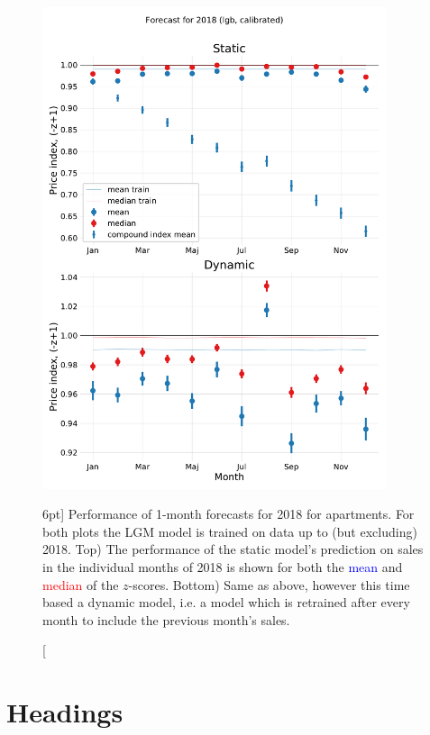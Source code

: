 \documentclass[a4paper, twoside, nobib]{tufte-book}
\begin{document}
\begin{figure}
  \includegraphics[width=0.9\textwidth, trim=0 0 0 70, clip]{figures/housing/Ejerlejlighed_v17_cut_all_Ncols_all__lgb_forecast_prediction_2018.pdf}
  \caption[2018 LGB Forecast][6pt]
          {Performance of 1-month forecasts for 2018 for apartments. For both plots the LGM model is trained on data up to (but excluding) 2018. Top) The performance of the static model's prediction on sales in the individual months of 2018 is shown for both the \textcolor{blue}{mean} and \textcolor{red}{median} of the $z$-scores. Bottom) Same as above, however this time based a dynamic model, i.e. a model which is retrained after every month to include the previous month's sales.
          } 
  \label{fig:h:forecast_2018_lgb}
\end{figure}









\section{Headings}\label{sec:headings1}
\end{document}
